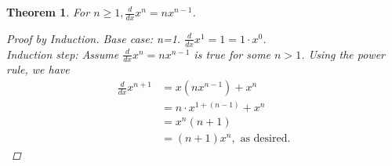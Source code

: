 \documentclass[letterpaper]{article}
\newtheorem{theorem}{Theorem}[section]
\begin{document}
    \begin{theorem}
        For $n\geq 1, \frac{d}{dx}x^n = nx^{n-1}$.
        \begin{proof} [Proof by Induction]
            Base case: n=1. $\frac{d}{dx}x^1=1=1\cdot x^0$. \\
            Induction step: Assume $\frac{d}{dx}x^n = nx^{n-1}$ is true for some $n>1$. 
            Using the power rule, we have
            \begin{align*}
                \frac{d}{dx}x^{n+1} &= x(nx^{n-1})+x^n \\
                &= n\cdot x^{1+(n-1)}+x^n \\
                &= x^n(n+1) \\
                &= (n+1)x^n, \text{ as desired.}
            \end{align*}
        \end{proof}
    \end{theorem}
\end{document}
